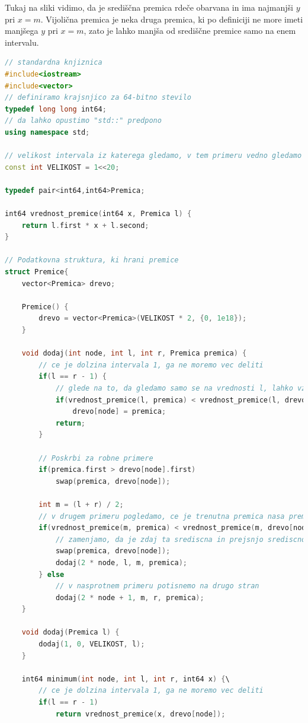 Tukaj na sliki vidimo, da je središčna premica rdeče obarvana in ima najmanjši $y$ pri $x = m$.
Vijolična premica je neka druga premica, ki po definiciji ne more imeti manjšega $y$ pri $x = m$, zato je lahko manjša od središčne premice samo na enem intervalu.

\begin{lstlisting}[label={lst:code5}, language=C++]
// standardna knjiznica
#include<iostream>
#include<vector>
// definiramo krajsnjico za 64-bitno stevilo
typedef long long int64;
// da lahko opustimo "std::" predpono
using namespace std;

// velikost intervala iz katerega gledamo, v tem primeru vedno gledamo x na intervalu [1, 10^6]
const int VELIKOST = 1<<20;

typedef pair<int64,int64>Premica;

int64 vrednost_premice(int64 x, Premica l) {
    return l.first * x + l.second;
}

// Podatkovna struktura, ki hrani premice
struct Premice{
    vector<Premica> drevo;

    Premice() {
        drevo = vector<Premica>(VELIKOST * 2, {0, 1e18});
    }

    void dodaj(int node, int l, int r, Premica premica) {
        // ce je dolzina intervala 1, ga ne moremo vec deliti
        if(l == r - 1) {
            // glede na to, da gledamo samo se na vrednosti l, lahko vzamemo premico, ki ima manjso vrednost in drugo zavrzemo
            if(vrednost_premice(l, premica) < vrednost_premice(l, drevo[node]))
                drevo[node] = premica;
            return;
        }

        // Poskrbi za robne primere
        if(premica.first > drevo[node].first)
            swap(premica, drevo[node]);

        int m = (l + r) / 2;
        // v drugem primeru pogledamo, ce je trenutna premica nasa premica primerna za srediscno premico
        if(vrednost_premice(m, premica) < vrednost_premice(m, drevo[node])) {
            // zamenjamo, da je zdaj ta srediscna in prejsnjo srediscno premico potisnemo dol
            swap(premica, drevo[node]);
            dodaj(2 * node, l, m, premica);
        } else
            // v nasprotnem primeru potisnemo na drugo stran
            dodaj(2 * node + 1, m, r, premica);
    }

    void dodaj(Premica l) {
        dodaj(1, 0, VELIKOST, l);
    }

    int64 minimum(int node, int l, int r, int64 x) {\
        // ce je dolzina intervala 1, ga ne moremo vec deliti
        if(l == r - 1)
            return vrednost_premice(x, drevo[node]);



\end{lstlisting}
